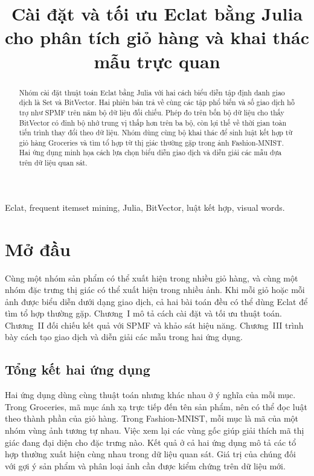 \documentclass[conference,a4paper]{IEEEtran}
\renewcommand{\refname}{Tài liệu tham khảo}
\begin{document}
\renewcommand{\refname}{Tài liệu tham khảo}
\pagestyle{plain}
\title{Cài đặt và tối ưu Eclat bằng Julia\\cho phân tích giỏ hàng và khai thác mẫu trực quan}
\author{
}
\maketitle
\begin{abstract}
Nhóm cài đặt thuật toán Eclat bằng Julia với hai cách biểu diễn tập
định danh giao dịch là Set và BitVector. Hai phiên bản trả về cùng
các tập phổ biến và số giao dịch hỗ trợ như SPMF trên năm bộ dữ liệu
đối chiếu. Phép đo trên bốn bộ dữ liệu cho thấy BitVector có đỉnh bộ
nhớ trung vị thấp hơn trên ba bộ, còn lợi thế về thời gian toàn tiến
trình thay đổi theo dữ liệu. Nhóm dùng cùng bộ khai thác để sinh luật
kết hợp từ giỏ hàng Groceries và tìm tổ hợp từ thị giác thường gặp
trong ảnh Fashion-MNIST. Hai ứng dụng minh họa cách lựa chọn biểu diễn
giao dịch và diễn giải các mẫu dựa trên dữ liệu quan sát.
\end{abstract}
\begin{IEEEkeywords}
Eclat, frequent itemset mining, Julia, BitVector, luật kết hợp, visual words.
\end{IEEEkeywords}
\section*{Mở đầu}
Cùng một nhóm sản phẩm có thể xuất hiện trong nhiều giỏ hàng,
và cùng một nhóm đặc trưng thị giác có thể xuất hiện trong nhiều
ảnh. Khi mỗi giỏ hoặc mỗi ảnh được biểu diễn dưới dạng giao dịch,
cả hai bài toán đều có thể dùng Eclat để tìm tổ hợp thường gặp.
Chương~I mô tả cách cài đặt và tối ưu thuật toán. Chương~II
đối chiếu kết quả với SPMF và khảo sát hiệu năng. Chương~III
trình bày cách tạo giao dịch và diễn giải các mẫu trong hai ứng dụng.






\subsection{Tổng kết hai ứng dụng}
Hai ứng dụng dùng cùng thuật toán nhưng khác nhau ở ý nghĩa của
mỗi mục. Trong Groceries, mã mục ánh xạ trực tiếp đến tên sản phẩm,
nên có thể đọc luật theo thành phần của giỏ hàng. Trong Fashion-MNIST,
mỗi mục là mã của một nhóm vùng ảnh tương tự nhau. Việc xem lại các
vùng gốc giúp giải thích mã thị giác đang đại diện cho đặc trưng nào.
Kết quả ở cả hai ứng dụng mô tả các tổ hợp thường xuất hiện cùng
nhau trong dữ liệu quan sát. Giá trị của chúng đối với gợi ý sản phẩm
và phân loại ảnh cần được kiểm chứng trên dữ liệu mới.
\end{document}

